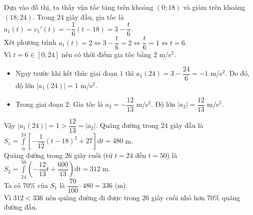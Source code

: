 \begin{ex}
{\begin{itemize}
		\end{itemize}
		\begin{itemchoice}
			\itemch Dựa vào đồ thị, ta thấy vận tốc tăng trên khoảng $(0; 18)$ và giảm trên khoảng $(18; 24)$.
			\itemch Trong $24$ giây đầu, gia tốc là $a_1(t)=v_1'(t)=-\dfrac{1}{6}(t-18)=3-\dfrac{t}{6}$. \\
			Xét phương trình $a_1(t)=2 \Leftrightarrow 3-\dfrac{t}{6}=2 \Leftrightarrow \dfrac{t}{6}=1 \Leftrightarrow t=6$. \\
			Vì $t=6 \in [0; 24]$ nên có thời điểm gia tốc bằng $2$ m/s$^2$.
			\itemch
			\begin{itemize}
				\item Ngay trước khi kết thúc giai đoạn $1$ thì
				$a_1(24)=3-\dfrac{24}{6}=-1$ m/s$^2$. Do đó, độ lớn $\left|a_1(24)\right|=1$ m/s$^2$.
				\item Trong giai đoạn $2$: Gia tốc là
				$a_2=-\dfrac{12}{13}$ m/s$^2$.
				Độ lớn $\left|a_2\right|=\dfrac{12}{13}$ m/s$^2$.
			\end{itemize}
			Vậy $\left|a_1(24)\right|=1 > \dfrac{12}{13}=\left|a_2\right|$.
			\itemch
			Quãng đường trong $24$ giây đầu là
			$S_1=\displaystyle\int\limits_0^{24}\left[-\dfrac{1}{12}(t-18)^2+27\right]\mathrm{d}t=480$ m. \\
			Quãng đường trong $26$ giây cuối (từ $t=24$ đến $t=50$) là
			$S_2=\displaystyle\int\limits_{24}^{50}\left(-\dfrac{12}{13}t+\dfrac{600}{13}\right)\mathrm{d}t=312$ m. \\
			Ta có $70\%$ của $S_1$ là $\dfrac{70}{100}\cdot 480 = 336$ (m). \\
			Vì $312 < 336$ nên quãng đường đi được trong $26$ giây cuối nhỏ hơn $70\%$ quãng đường đầu.
		\end{itemchoice}
	}
\end{ex}

